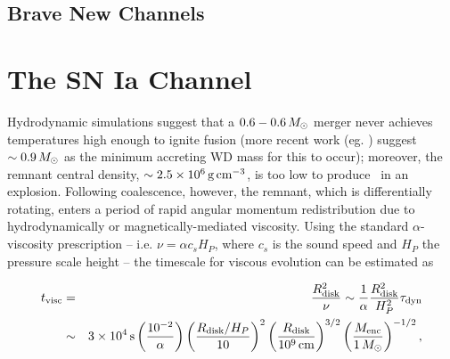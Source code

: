 \subsection{Brave New Channels}

\section{The \citeal{vkercj10} SN Ia Channel}



Hydrodynamic simulations \citep{loreig09} suggest that a $0.6-0.6\,\Msun$ merger never achieves temperatures high enough to ignite fusion (more recent work (eg. \citep{pakm+11, dan+12}) suggest $\sim0.9\,\Msun$ as the minimum accreting WD mass for this to occur); moreover, the remnant central density, $\sim2.5\times10^6\,\gcc$, is too low to produce \Ni\ in an explosion.  Following coalescence, however, the remnant, which is differentially rotating, enters a period of rapid angular momentum redistribution due to hydrodynamically or magnetically-mediated viscosity.  Using the standard $\alpha$-viscosity prescription \cite{shaks73} -- i.e. $\nu = \alpha c_s H_P$, where $c_s$ is the sound speed and $H_P$ the pressure scale height -- the timescale for viscous evolution can be estimated as

\begin{eqnarray}
t_\mrm{visc} &=& \frac{R_\mrm{disk}^2}{\nu} \sim \frac{1}{\alpha}\frac{R_\mrm{disk}^2}{H_P^2}\taudyn \nonumber \\
			&\sim& 3\times10^4\,\mrm{s}\left(\frac{10^{-2}}{\alpha}\right)\left(\frac{R_\mrm{disk}/H_P}{10}\right)^2\left(\frac{R_\mrm{disk}}{10^9\,\mrm{cm}}\right)^{3/2}\left(\frac{M_\mrm{enc}}{1\,\Msun}\right)^{-1/2},
\end{eqnarray}


